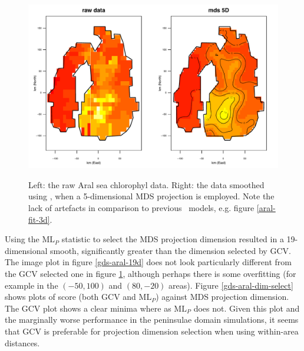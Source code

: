 \begin{figure}[t]
\centering
\includegraphics[width=\textwidth]{mds/figs/aral-5d-duchon.pdf} \\
\caption{Left: the raw Aral sea chlorophyl data. Right: the data smoothed using \mdsds, when a 5-dimensional MDS projection is employed. Note the lack of artefacts in comparison to previous \mdsap\ models, e.g. figure \ref{aral-fit-3d}.}
\label{mds-aral-5d-duchon}
\end{figure}

Using the $\text{ML}_P$ statistic to select the MDS projection dimension resulted in a 19-dimensional smooth, significantly greater than the dimension selected by GCV. The image plot in figure \ref{gds-aral-19d} does not look particularly different from the GCV selected one in figure \ref{mds-aral-5d-duchon}, although perhaps there is some overfitting (for example in the $(-50,100)$ and $(80,-20)$ areas). Figure \ref{gds-aral-dim-select} shows plots of score (both GCV and $\text{ML}_P$) against MDS projection dimension. The GCV plot shows a clear minima where as $\text{ML}_P$ does not. Given this plot and the marginally worse performance in the peninsulae domain simulations, it seems that GCV is preferable for projection dimension selection when using within-area distances.

